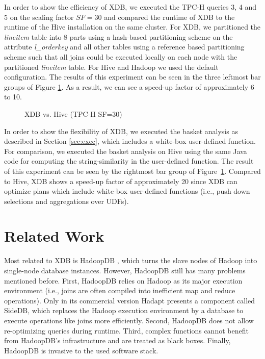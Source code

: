 \documentclass{sig-alternate}
\begin{document}
In order to show the efficiency of XDB, we executed the TPC-H queries 3, 4 and 5 on the scaling factor $SF=30$ and compared the runtime of XDB to the runtime of the Hive installation on the same cluster. For XDB, we partitioned the \emph{lineitem} table into 8 parts using a hash-based partitioning scheme on the attribute \emph{l\_orderkey} and all other tables using a reference based partitioning scheme such that all joins could be executed locally on each node with the partitioned \emph{lineitem} table. For Hive and Hadoop we used the default configuration. The results of this experiment can be seen in the three leftmost bar groups of Figure \ref{fig:perf}. As a result, we can see a speed-up factor of approximately 6 to 10.
 
\begin{figure}[ht] 
\vspace{-2ex}
\vspace{-3ex}
\caption{XDB vs. Hive (TPC-H SF=30)}
\vspace{-1ex}
\label{fig:perf}
\end{figure}

In order to show the flexibility of XDB, we executed the basket analysis as described in Section \ref{sec:exec}, which includes a white-box user-defined function. For comparison, we executed the basket analysis on Hive using the same Java code for computing the string-similarity in the user-defined function. The result of this experiment can be seen by the rightmost bar group of Figure~\ref{fig:perf}. Compared to Hive, XDB shows a speed-up factor of approximately 20 since XDB can optimize plans which include white-box user-defined functions (i.e., push down selections and aggregations over UDFs). 

\section{Related Work}
\label{sec:rel}

Most related to XDB is HadoopDB \cite{HadoopDB:SIGMOD:2010}, which turns the slave nodes of Hadoop into single-node database instances. However, HadoopDB still has many problems mentioned before. First, HadoopDB relies on Hadoop as its major execution environment (i.e., joins are often compiled into inefficient map and reduce operations). Only in its commercial version Hadapt \cite{Hadapt:SIGMOD:2011} presents a component called SideDB, which replaces the Hadoop execution environment by a database to execute operations like joins more efficiently. Second, HadoopDB does not allow re-optimizing queries during runtime. Third, complex functions cannot benefit from HadoopDB's infrastructure and are treated as black boxes. Finally, HadoopDB is invasive to the used software stack. 
\end{document}
